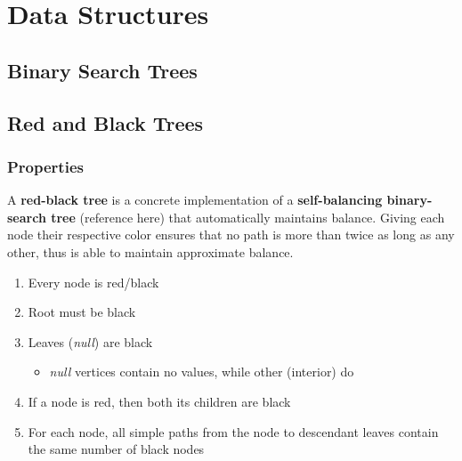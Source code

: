 \documentclass[10pt, 
a4paper, 
oneside, 
headinclude, footinclude, 
BCOR5mm]
{scrartcl}
\begin{document}
\section{Data Structures}
\subsection{Binary Search Trees}

\newpage

\subsection{Red and Black Trees}
\subsubsection{Properties}
A \textbf{red-black tree} is a concrete implementation of a \textbf{self-balancing binary-search tree} (reference here) that automatically maintains balance. 
Giving each node their respective color ensures that no path is more than twice as long as any other, thus is able to maintain approximate balance.\
\begin{enumerate}
    \item Every node is {\color{red}red}/black
    \item Root must be black
    \item Leaves (\textit{null}) are black
    \begin{itemize}
        \item \textit{null} vertices contain no values, while other (interior) do
    \end{itemize}
    \item If a node is {\color{red}red}, then both its children are black
    \item For each node, all simple paths from the node to descendant leaves contain the same number of black nodes 
\end{enumerate}
\end{document}

